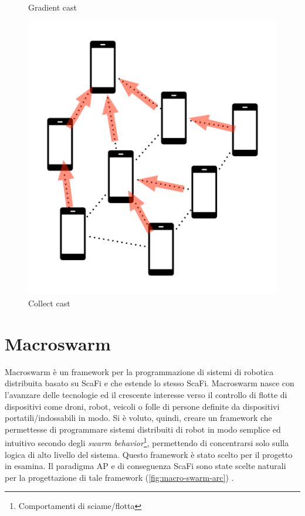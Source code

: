 \documentclass[12pt,a4paper,openright,twoside]{book}
\begin{document}
\begin{figure}[H]
\begin{minipage}[b]{0.3\textwidth}
        \caption{Gradient cast}
        \label{fig:gradient-cast}
    \end{minipage}
    \hfill
    \begin{minipage}[b]{0.3\textwidth}
        \includegraphics[width=\textwidth]{figures/collect-cast.pdf}
        \caption{Collect cast}
        \label{fig:collect-cast}
    \end{minipage}
\end{figure}

\section{Macroswarm}

Macroswarm è un framework per la programmazione di sistemi di robotica distribuita basato su ScaFi e che estende lo stesso ScaFi. Macroswarm nasce con l'avanzare delle tecnologie ed il crescente interesse verso il controllo di flotte di dispositivi come droni, robot, veicoli o folle di persone definite da dispositivi portatili/indossabili in modo.
Si è voluto, quindi, creare un framework che permettesse di programmare sistemi distribuiti di robot in modo semplice ed intuitivo secondo degli \textit{swarm behavior}\footnote{Comportamenti di sciame/flotta}, permettendo di concentrarsi solo sulla logica di alto livello del sistema. Questo framework è stato scelto per il progetto in esamina.
Il paradigma \ac{AP} e di conseguenza ScaFi sono state scelte naturali per la progettazione di tale framework (\cref{fig:macro-swarm-arc}) \cite{Macroswarm}.
\end{document}

